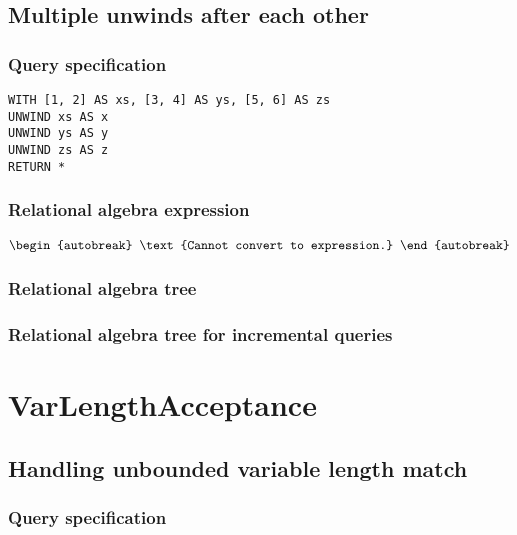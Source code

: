 \subsection{Multiple unwinds after each other}

\subsubsection*{Query specification}

\begin{lstlisting}
WITH [1, 2] AS xs, [3, 4] AS ys, [5, 6] AS zs
UNWIND xs AS x
UNWIND ys AS y
UNWIND zs AS z
RETURN *
\end{lstlisting}

\subsubsection*{Relational algebra expression}

\begin{align*}
\begin{autobreak}
\text{Cannot convert to expression.}
\end{autobreak}
\end{align*}

\subsubsection*{Relational algebra tree}


\subsubsection*{Relational algebra tree for incremental queries}

\section{VarLengthAcceptance}


\subsection{Handling unbounded variable length match}

\subsubsection*{Query specification}

